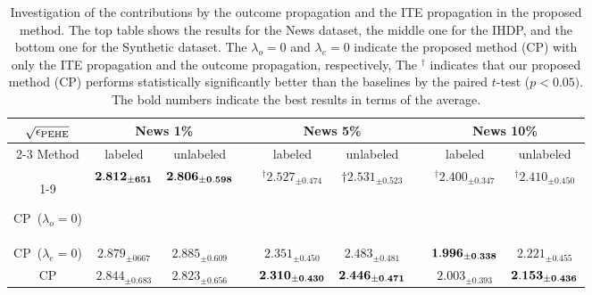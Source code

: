 \begin{table}[tbp]
\caption{Investigation of the contributions by the outcome propagation and the ITE propagation in the proposed method.
The top table shows the results for the News dataset, the middle one for the IHDP, and the bottom one for the Synthetic dataset.
The $\lambda_o=0$ and $\lambda_e=0$ indicate the proposed method (CP) with only the ITE propagation and the outcome propagation, respectively,
The $^\dagger$ indicates that our proposed method (CP) performs statistically significantly better than the baselines by the paired $t$-test ($p<0.05)$. 
The bold numbers indicate the best results in terms of the average.}\label{table:proposed_comparison} 
\vspace{2mm}
  \centering
\begin{tabular} {ccccccccc }
\toprule[2pt]
        $ \sqrt{\epsilon_{\rm PEHE}} $         & \multicolumn{2}{c}{ \bf{News} 1\%}        &              & \multicolumn{2}{c}{\bf{News} 5\%}& &  \multicolumn{2}{c}{\bf{News} 10\%}      \\[3pt]\cmidrule{2-3}\cmidrule{5-6}\cmidrule{8-9}
Method                      & labeled  & unlabeled & \multicolumn{1}{l}{} & labeled & unlabeled & \multicolumn{1}{l}{} & labeled & unlabeled\\[3pt] \cmidrule{1-9}

CP~($\lambda_o=0$)  &  $\bf 2.812_{\pm{651}}$ & $\bf 2.806_{\pm{0.598}}$  & \multicolumn{1}{l}{} &  $^\dagger2.527_{\pm{0.474}}$  & $\dagger2.531_{\pm{0.523}}$  &     &  $^\dagger2.400_{\pm{0.347}}$ & $^\dagger2.410_{\pm{0.450}}$  \\[3pt]

CP~($\lambda_e=0$) &        $2.879_{\pm{0667}}$       &       $2.885_{\pm{0.609}}$         & \multicolumn{1}{l}{} &     $ 2.351_{\pm{0.450}}$   &   $2.483_{\pm{0.481}}$      &       &  $\bf 1.996_{\pm{0.338}}$ & $2.221_{\pm{0.455}}$   \\[3pt]

CP &        $2.844_{\pm{0.683}}$       &       $2.823_{\pm{0.656}}$        & \multicolumn{1}{l}{} &     $\bf 2.310_{\pm{0.430}}$          & $\bf 2.446_{\pm{0.471}}$       &  &   $2.003_{\pm{0.393}} $& $\bf 2.153_{\pm{0.436}}$      \\[3pt]
\bottomrule[2pt]
\end{tabular}
    \vspace{3mm} \\
    

\end{table}
